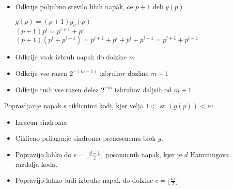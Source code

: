 \documentclass{article}
\begin{document}
\begin{multicols}{2}
\begin{itemize}
		\item Odkrije poljubno stevilo lihih napak, ce $p + 1$ deli $g(p)$
		      \begin{center}
			      \begin{math}
				      g(p) = (p + 1) g_g(p)
			      \end{math}\\
			      \begin{math}
				      (p + 1) p^i =  p^{i+1} + p^i
			      \end{math}\\
			      \begin{math}
				      (p + 1)(p^i + p^{i - 1}) = p^{i + 1} + p^i + p^i + p^{i-1} = p^{i + 1} + p^{i-1}
			      \end{math}\\
		      \end{center}
		\item Odkrije vsak izbruh napak do dolzine $m$
		\item Odkrije vse razen $2^{-(m-1)}$ izbruhov dozline $m + 1$
		\item Odkrije tudi vse razen delez $2^{-m}$ izbruhov daljsih od $m + 1$
	\end{itemize}
	Popravljanje napak s ciklicnimi kodi, kjer velja $1 < \text{ st }(g(p)) < n$:
	\begin{itemize}
		\item Izracun sindroma
		\item Ciklicno prilaganje sindroma prenesenemu blok $y$.
		\item Popravijo lahko do $e = \lfloor \frac{d-1}{2} \rfloor$ posamicnih napak, kjer je
		      $d$ Hammingova razdalja koda.
		\item Popravijo lahko tudi izbruhe napak do dolzine $e = \lfloor \frac{m}{2} \rfloor$
	\end{itemize}


\end{multicols}
\end{document}
